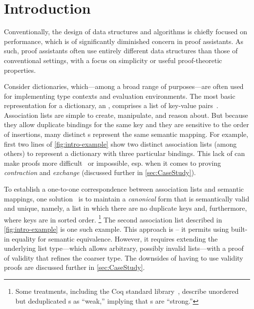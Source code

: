 \section{Introduction}
\label{sec:Introduction}


Conventionally, the design of data structures and algorithms is chiefly focused on performance, which is of significantly diminished concern in proof assistants.
%
As such, proof assistants often use entirely different data structures than those of conventional settings, with a focus on simplicity or useful proof-theoretic properties.

Consider dictionaries, which---among a broad range of purposes---are often used for implementing type contexts and evaluation environments.
%
The most basic representation for a dictionary, an \emph{\sal}, comprises a list of key-value pairs~\citep[Lists]{Pierce:SF1}.
%
Association lists are simple to create, manipulate, and reason about.
%
But because they allow duplicate bindings for the same key and they are sensitive to the order of insertions, many distinct \sal{}s represent the same semantic mapping.
%
For example, first two lines of \autoref{fig:intro-example}
%
%
show two distinct association lists (among others) to represent a dictionary with three particular bindings.
%
This lack of \emph{\Extensional} can make proofs more difficult~\cite[Maps]{Pierce:SF1} or impossible, esp. when it comes to proving \emph{contraction} and \emph{exchange}%
\citep{StructProp}
%
(discussed further in \autoref{sec:CaseStudy}).



To establish a one-to-one correspondence between association lists and semantic mappings, one solution~\citep{FMapList} is to maintain a \emph{canonical}
%
form that is semantically valid and unique, namely, a list in which there are no duplicate keys and, furthermore, where keys are in sorted order.%
%
\footnote{\hspace{0.01in}%
%
Some treatments, including the Coq standard library~\citep{FMapInterface}, describe unordered but deduplicated \sal{}s as ``weak,'' implying that \cal{}s are ``strong.''
%
}
%
The second association list described in \autoref{fig:intro-example} is one such example.
%
This approach is \emph{\extensional} -- \ie{} it permits using built-in equality for semantic equivalence. However, it requires extending the underlying list type---which allows arbitrary, possibly invalid lists---with a proof of validity that refines the coarser type. The downsides of having to use validity proofs are discussed further in \autoref{sec:CaseStudy}.

